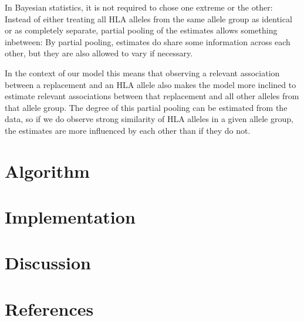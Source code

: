 \documentclass[fleqn,11pt]{SelfArx} %
\begin{document}
  In Bayesian statistics, it is not required to chose one extreme or the other:
  Instead of either treating all HLA alleles from the same allele group as identical or
  as completely separate, partial pooling of the estimates allows something inbetween:
  By partial pooling, estimates do share some information across each other, but they are
  also allowed to vary if necessary.

  In the context of our model this means that observing a relevant association between
  a replacement and an HLA allele also makes the model more inclined to estimate
  relevant associations between that replacement and all other alleles from that allele group.
  The degree of this partial pooling can be estimated from the data, so if we do observe
  strong similarity of HLA alleles in a given allele group, the estimates are more
  influenced by each other than if they do not.


\section{Algorithm}
\section{Implementation}
\section{Discussion}
\section{References}

\thispagestyle{empty} %


\FloatBarrier



\end{document}
